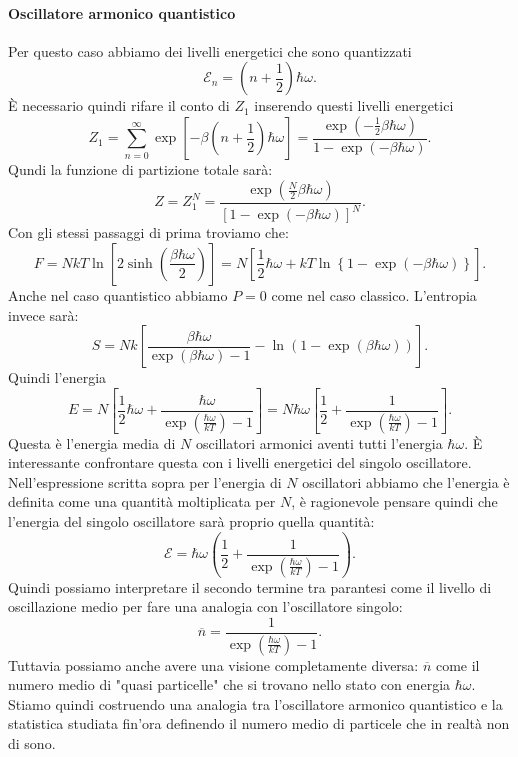 \paragraph{Oscillatore armonico quantistico}
Per questo caso abbiamo dei livelli energetici che sono quantizzati
\[
	\mathcal{E} _{n}=\left( n + \frac{1}{2} \right) \hbar \omega 
.\] 
È necessario quindi rifare il conto di $Z_1$ inserendo questi livelli energetici
\[
	Z_1 = \sum_{n=0}^{\infty} \exp\left[ -\beta \left( n + \frac{1}{2} \right) \hbar\omega  \right] =
	\frac{\exp\left( -\frac{1}{2}\beta \hbar\omega  \right) }{1- \exp\left( -\beta \hbar\omega  \right) }
.\] 
Qundi la funzione di partizione totale sarà:
\[
	Z = Z_1^{N} = \frac{\exp\left( \frac{N}{2}\beta \hbar\omega  \right) }{\left[ 1-\exp\left( -\beta \hbar\omega  \right)  \right] ^N}
.\] 
Con gli stessi passaggi di prima troviamo che:
\[
	F = NkT\ln\left[ 2\sinh\left( \frac{\beta \hbar\omega }{2} \right)  \right] = N \left[ \frac{1}{2}\hbar\omega + kT \ln\left\{ 1-\exp\left( -\beta \hbar\omega  \right)  \right\}  \right] 
.\] 
Anche nel caso quantistico abbiamo $P=0$ come nel caso classico. L'entropia invece sarà:
\[
	S = Nk\left[ \frac{\beta \hbar\omega }{\exp\left( \beta \hbar\omega  \right) -1} - \ln\left( 1-\exp\left( \beta \hbar\omega  \right)  \right)  \right] 
.\] 
Quindi l'energia
\[
	E = N\left[ \frac{1}{2}\hbar\omega + \frac{\hbar\omega }{\exp\left( \frac{\hbar\omega }{kT} \right) -1} \right] =
	N\hbar\omega \left[ \frac{1}{2}+ \frac{1}{\exp\left( \frac{\hbar\omega }{kT} \right) -1} \right]
.\] 
Questa è l'energia media di $N$ oscillatori armonici aventi tutti l'energia $\hbar\omega $. È interessante confrontare questa con i livelli energetici del singolo oscillatore.
Nell'espressione scritta sopra per l'energia di $N$ oscillatori abbiamo che l'energia è definita come una quantità moltiplicata per $N$, è ragionevole pensare quindi che l'energia del singolo oscillatore sarà proprio quella quantità:
\[
	\mathcal{E} = \hbar\omega \left( \frac{1}{2} + \frac{1}{\exp\left( \frac{\hbar\omega }{kT} \right) -1} \right) 
.\] 
Quindi possiamo interpretare il secondo termine tra parantesi come il livello di oscillazione medio per fare una analogia con l'oscillatore singolo:
\[
	\overline{n} = \frac{1}{\exp\left( \frac{\hbar\omega }{kT} \right) -1}
.\] 
Tuttavia possiamo anche avere una visione completamente diversa: $\overline{n}$ come il numero medio di "quasi particelle" che si trovano nello stato con energia $\hbar\omega $. \\
Stiamo quindi costruendo una analogia tra l'oscillatore armonico quantistico e la statistica studiata fin'ora definendo il numero medio di particele che in realtà non di sono.\\
